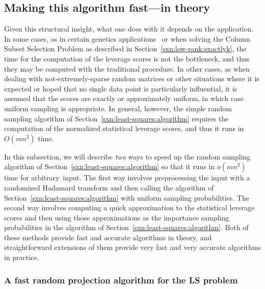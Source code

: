 \documentclass[twoside]{article}
\begin{document}
\subsection{Making this algorithm fast---in theory}
\label{sxn:least-squares:faster-th}

Given this structural insight, what one does with it depends on the 
application.
In some cases, as in certain genetics 
applications~\cite{Paschou07b,Paschou08a,CUR_PNAS} or when solving the Column Subset Selection Problem as
described in Section~\ref{sxn:low-rank:exactlyk}, the time for the 
computation of the leverage scores is not the bottleneck, and thus they may 
be computed with the traditional procedure. 
In other cases, as when dealing with not-extremely-sparse random matrices 
or other situations where it is expected or hoped that no single data point 
is particularly influential, it is assumed that the scores are exactly or 
approximately uniform, in which case uniform sampling is appropriate.
In general, however, the simple random sampling algorithm of 
Section~\ref{sxn:least-squares:algorithm} requires the computation of the
normalized statistical leverage scores, and thus it runs in $O(mn^2)$ time.

In this subsection, we will describe \emph{two} ways to speed up the random 
sampling algorithm of Section~\ref{sxn:least-squares:algorithm} so that it 
runs in $o(mn^2)$ time for arbitrary~input.
The first way involves preprocessing the input with a randomized Hadamard 
transform and then calling the algorithm of 
Section~\ref{sxn:least-squares:algorithm} with uniform sampling probabilities.
The second way involves computing a quick approximation to the statistical 
leverage scores and then using those approximations as the importance sampling 
probabilities in the algorithm of Section~\ref{sxn:least-squares:algorithm}. 
Both of these methods provide fast and accurate algorithms in 
theory, and straightforward extensions of them provide very fast and very 
accurate algorithms in practice.


\subsubsection{A fast random projection algorithm for the LS problem}
\label{sxn:least-squares:faster-th:rand-proj}
\end{document}
